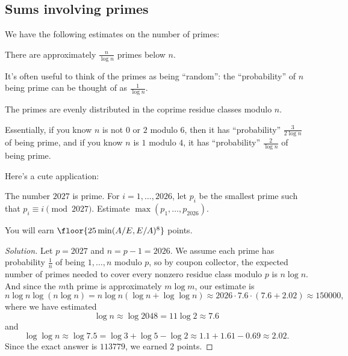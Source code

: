 \documentclass[11pt]{scrartcl}
\renewenvironment{solution}{\renewcommand\qedsymbol{$\blacksquare$}\begin{proof}[Solution]}{\end{proof}}
\begin{document}
\subsection{Sums involving primes}

We have the following estimates on the number of primes:

\begin{theorem}
	There are approximately $\frac n{\log n}$ primes below $n$.
\end{theorem}

It's often useful to think of the primes as being ``random'': the ``probability'' of $n$ being prime can be thought of as $\frac1{\log n}$.

\begin{theorem}\label{thm:pntap}
	The primes are evenly distributed in the coprime residue classes modulo $n$.
\end{theorem}

Essentially, if you know $n$ is not $0$ or $2$ modulo $6$, then it has ``probability'' $\frac3{2\log n}$ of being prime, and if you know $n$ is $1$ modulo $4$, it has ``probability'' $\frac{2}{\log n}$ of being prime.

Here's a cute application:

\begin{example}
    The number $2027$ is prime. For $i = 1,\dots,2026$, let $p_i$ be the smallest prime such that $p_i \equiv i \pmod{2027}$. Estimate $\max(p_1,\dots,p_{2026})$.

    You will earn $\floor{25\min(A/E,E/A)^8}$ points.
\end{example}

\begin{solution}
	Let $p = 2027$ and $n = p - 1 = 2026$. We assume each prime has probability $\frac1n$ of being $1,\dots,n$ modulo $p$, so by coupon collector, the expected number of primes needed to cover every nonzero residue class modulo $p$ is $n \log n$. And since the $m$th prime is approximately $m \log m$, our estimate is
	\[n\log n\log(n \log n) = n\log n(\log n + \log \log n) \approx 2026 \cdot 7.6 \cdot (7.6 + 2.02) \approx 150000,\]
	where we have estimated
	\[\log n \approx \log 2048 = 11 \log 2 \approx 7.6\]
	and
	\[\log \log n \approx \log 7.5 = \log 3 + \log 5 - \log 2 \approx 1.1 + 1.61 - 0.69 \approx 2.02.\]
	Since the exact answer is $113779$, we earned $2$ points.
\end{solution}
\end{document}
